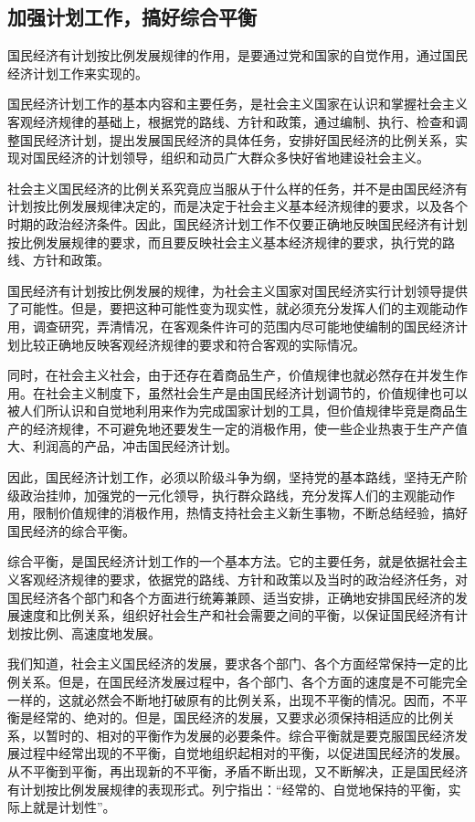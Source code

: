 \documentclass{book}
\begin{document}
\subsection{加强计划工作，搞好综合平衡}

国民经济有计划按比例发展规律的作用，是要通过党和国家的自觉作用，通过国民经济计划工作来实现的。

国民经济计划工作的基本内容和主要任务，是社会主义国家在认识和掌握社会主义客观经济规律的基础上，根据党的路线、方针和政策，通过编制、执行、检查和调整国民经济计划，提出发展国民经济的具体任务，安排好国民经济的比例关系，实现对国民经济的计划领导，组织和动员广大群众多快好省地建设社会主义。

社会主义国民经济的比例关系究竟应当服从于什么样的任务，并不是由国民经济有计划按比例发展规律决定的，而是决定于社会主义基本经济规律的要求，以及各个时期的政治经济条件。因此，国民经济计划工作不仅要正确地反映国民经济有计划按比例发展规律的要求，而且要反映社会主义基本经济规律的要求，执行党的路线、方针和政策。

国民经济有计划按比例发展的规律，为社会主义国家对国民经济实行计划领导提供了可能性。但是，要把这种可能性变为现实性，就必须充分发挥人们的主观能动作用，调查研究，弄清情况，在客观条件许可的范围内尽可能地使编制的国民经济计划比较正确地反映客观经济规律的要求和符合客观的实际情况。

同时，在社会主义社会，由于还存在着商品生产，价值规律也就必然存在并发生作用。在社会主义制度下，虽然社会生产是由国民经济计划调节的，价值规律也可以被人们所认识和自觉地利用来作为完成国家计划的工具，但价值规律毕竞是商品生产的经济规律，不可避免地还要发生一定的消极作用，使一些企业热衷于生产产值大、利润高的产品，冲击国民经济计划。

因此，国民经济计划工作，必须以阶级斗争为纲，坚持党的基本路线，坚持无产阶级政治挂帅，加强党的一元化领导，执行群众路线，充分发挥人们的主观能动作用，限制价值规律的消极作用，热情支持社会主义新生事物，不断总结经验，搞好国民经济的综合平衡。

综合平衡，是国民经济计划工作的一个基本方法。它的主要任务，就是依据社会主义客观经济规律的要求，依据党的路线、方针和政策以及当时的政治经济任务，对国民经济各个部门和各个方面进行统筹兼顾、适当安排，正确地安排国民经济的发展速度和比例关系，组织好社会生产和社会需要之间的平衡，以保证国民经济有计划按比例、高速度地发展。

我们知道，社会主义国民经济的发展，要求各个部门、各个方面经常保持一定的比例关系。但是，在国民经济发展过程中，各个部门、各个方面的速度是不可能完全一样的，这就必然会不断地打破原有的比例关系，出现不平衡的情况。因而，不平衡是经常的、绝对的。但是，国民经济的发展，又要求必须保持相适应的比例关系，以暂时的、相对的平衡作为发展的必要条件。综合平衡就是要克服国民经济发展过程中经常出现的不平衡，自觉地组织起相对的平衡，以促进国民经济的发展。从不平衡到平衡，再出现新的不平衡，矛盾不断出现，又不断解决，正是国民经济有计划按比例发展规律的表现形式。列宁指出：“经常的、自觉地保持的平衡，实际上就是计划性”。
\end{document}
